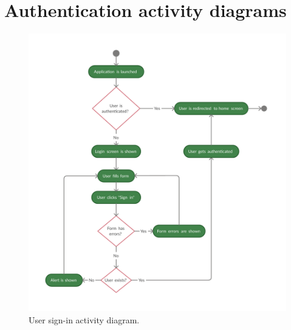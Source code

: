 \documentclass[
  printed, %
  table,   %
  oneside, %
  lof,     %
  lot,     %
]{fithesis3}
\begin{document}
\section{Authentication activity diagrams}
    \begin{figure}[H]
        \begin{center}
            \includegraphics[width=\textwidth]{figures/diagrams/sign_in_flow}
        \end{center}
        \caption{User sign-in activity diagram.}
        \label{fig:sign_in_flow}
    \end{figure}
    
\end{document}
